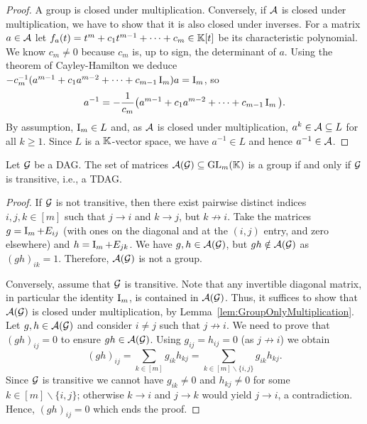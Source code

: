 \begin{proof}
	A group is closed under multiplication. Conversely, if $\mathcal{A}$ is closed under multiplication, we have to show that it is also closed under inverses. For a matrix $a \in \mathcal{A}$ let $f_a(t) = t^m + c_1 t^{m-1} + \dots + c_m \in \mathbb K[t]$ be its characteristic polynomial. We know $c_m \neq 0$ because $c_m$ is, up to sign, the determinant of $a$.
	Using the theorem of Cayley-Hamilton we deduce $-c_m^{-1}(a^{m-1} + c_1 a^{m-2} + \dots + c_{m-1} \operatorname{I}_m) a = \operatorname{I}_m$, so
		\begin{align*}
			a^{-1} = - \frac{1}{c_m} \big( a^{m-1} + c_1 a^{m-2} + \dots + c_{m-1} \operatorname{I}_m \big).
		\end{align*}
	By assumption, $\operatorname{I}_m \in L$ and, as $\mathcal{A}$ is closed under multiplication, $a^k \in \mathcal{A} \subseteq L$ for all $k \geq 1$. Since $L$ is a $\mathbb K$-vector space, we have $a^{-1} \in L$ and hence $a^{-1} \in \mathcal{A}$.
\end{proof}


\begin{prop}\label{prop:TDAGgroup}
	Let $\mathcal{G}$ be a DAG.
	The set of matrices $\mathcal{A}(\mathcal{G}) \subseteq \operatorname{GL}_m(\mathbb K)$ is a group if and only if $\mathcal{G}$ is transitive, i.e., a TDAG.
\end{prop}

\begin{proof}
	If $\mathcal{G}$ is not transitive, then there exist pairwise distinct indices $i,j,k \in [m]$ such that $j\to i$ and $k\to j$, but $k \not \to i$. Take the matrices $g = \operatorname{I}_m + E_{ij}$ (with ones on the diagonal and at the $(i,j)$ entry, and zero elsewhere) and $h = \operatorname{I}_m + E_{jk}$.
	We have $g, h \in \mathcal{A}(\mathcal{G})$, but $gh \notin \mathcal{A}(\mathcal{G})$ as $(gh)_{ik}=1$. Therefore, $\mathcal{A}(\mathcal{G})$ is not a group. 
	
	Conversely, assume that $\mathcal{G}$ is transitive. Note that any invertible diagonal matrix, in particular the identity $\operatorname{I}_m$, is contained in $\mathcal{A}(\mathcal{G})$. Thus, it suffices to show that $\mathcal{A}(\mathcal{G})$ is closed under multiplication, by Lemma~\ref{lem:GroupOnlyMultiplication}. Let $g,h \in \mathcal{A}(\mathcal{G})$ and consider $i \neq j$ such that $j \not\to i$. We need to prove that $(gh)_{ij} = 0$ to ensure $gh \in \mathcal{A}(\mathcal{G})$. Using $g_{ij} = h_{ij} = 0$ (as $j \not\to i$) we obtain
		\[ (gh)_{ij} = \sum_{k \in [m]} g_{ik} h_{kj} = \sum_{k \in [m] \backslash \{i,j\}} g_{ik} h_{kj} . \]
	Since $\mathcal{G}$ is transitive we cannot have $g_{ik} \neq 0$ and $h_{kj} \neq 0$ for some $k \in [m] \backslash \{i,j\}$; otherwise $k \to i$ and $j \to k$ would yield $j \to i$, a contradiction. Hence, $(gh)_{ij} = 0$ which ends the proof.
\end{proof}

